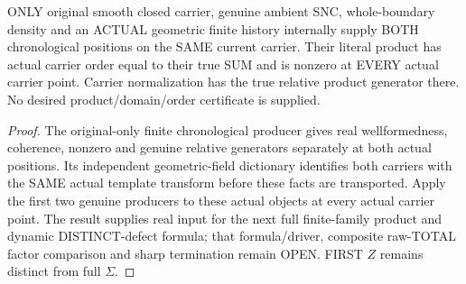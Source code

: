 \begin{theorem}
\label{hir:sharp-original-chronological-two-member-product-order}
\leanok
ONLY original smooth closed carrier, genuine ambient SNC, whole-boundary
density and an ACTUAL geometric finite history internally supply BOTH
chronological positions on the SAME current carrier. Their literal product
has actual carrier order equal to their true SUM and is nonzero at EVERY
actual carrier point. Carrier normalization has the true relative product
generator there. No desired product/domain/order certificate is supplied.
\end{theorem}
\begin{proof}
The original-only finite chronological producer gives real wellformedness,
coherence, nonzero and genuine relative generators separately at both
actual positions. Its independent geometric-field dictionary identifies
both carriers with the SAME actual template transform before these facts
are transported. Apply the first two genuine producers to these actual
objects at every actual carrier point. The result supplies real input
for the next full finite-family product and dynamic DISTINCT-defect formula;
that formula/driver, composite raw-TOTAL factor comparison and sharp
termination remain OPEN. FIRST $Z$ remains distinct from full $\Sigma$.
\end{proof}

